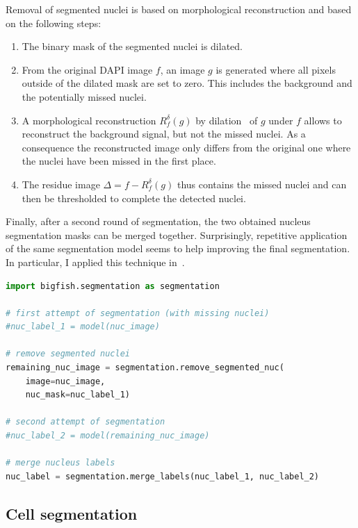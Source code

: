 Removal of segmented nuclei is based on morphological reconstruction and based on the following steps:
\begin{enumerate}
	\setlength\itemsep{0.1em}
	\item The binary mask of the segmented nuclei is dilated.
	\item From the original DAPI image $f$, an image $g$ is generated where all pixels outside of the dilated mask are set to zero.
	This includes the background and the potentially missed nuclei.
	\item A morphological reconstruction $R^{\delta}_f(g)$ by dilation~\cite{Serra1983, Soille2003, Robinson_2004} of $g$ under $f$ allows to reconstruct the background signal, but not the missed nuclei.
	As a consequence the reconstructed image only differs from the original one where the nuclei have been missed in the first place.
	\item The residue image $\Delta = f - R^{\delta}_f(g)$ thus contains the missed nuclei and can then be thresholded to complete the detected nuclei.
\end{enumerate}

\noindent
Finally, after a second round of segmentation, the two obtained nucleus segmentation masks can be merged together.
Surprisingly, repetitive application of the same segmentation model seems to help improving the final segmentation.
In particular, I applied this technique in~\cite{CHOUAIB_2020}.\\

\begin{minipage}{0.9\textwidth}
\begin{lstlisting}[language=Python]
import bigfish.segmentation as segmentation

# first attempt of segmentation (with missing nuclei)
#nuc_label_1 = model(nuc_image)

# remove segmented nuclei
remaining_nuc_image = segmentation.remove_segmented_nuc(
	image=nuc_image,
	nuc_mask=nuc_label_1)

# second attempt of segmentation
#nuc_label_2 = model(remaining_nuc_image)

# merge nucleus labels
nuc_label = segmentation.merge_labels(nuc_label_1, nuc_label_2)
\end{lstlisting}
\end{minipage}

\subsection{Cell segmentation}
\label{subsec:segmentation_cell}


